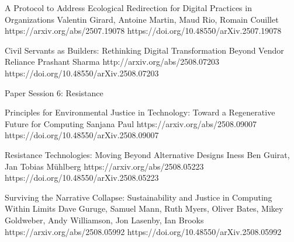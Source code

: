 	A Protocol to Address Ecological Redirection for Digital Practices in Organizations
Valentin Girard, Antoine Martin, Maud Rio, Romain Couillet
        https://arxiv.org/abs/2507.19078
        https://doi.org/10.48550/arXiv.2507.19078


	Civil Servants as Builders: Rethinking Digital Transformation Beyond Vendor Reliance
Prashant Sharma
        http://arxiv.org/abs/2508.07203
        https://doi.org/10.48550/arXiv.2508.07203


Paper Session 6: Resistance

	Principles for Environmental Justice in Technology: Toward a Regenerative Future for Computing
Sanjana Paul
        https://arxiv.org/abs/2508.09007
        https://doi.org/10.48550/arXiv.2508.09007

	Resistance Technologies: Moving Beyond Alternative Designs
Iness Ben Guirat, Jan Tobias Mühlberg
        https://arxiv.org/abs/2508.05223
        https://doi.org/10.48550/arXiv.2508.05223

	Surviving the Narrative Collapse: Sustainability and Justice in Computing Within Limits
Dave Guruge, Samuel Mann, Ruth Myers, Oliver Bates, Mikey Goldweber, Andy Williamson, Jon Lasenby, Ian Brooks
        https://arxiv.org/abs/2508.05992
        https://doi.org/10.48550/arXiv.2508.05992
        


